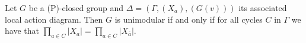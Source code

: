\documentclass[preview]{standalone}
\begin{document}
\begin{center}
Let $G$ be a (P)-closed group and $\Delta = (\Gamma, (X_a), (G(v)))$ its associated local action diagram. Then $G$ is unimodular if and only if for all cycles $C$ in $\Gamma$ we have that $\prod_{a \in C}|X_a| = \prod_{a \in C}|X_{\overline{a}}|$.
\end{center}
\end{document}

